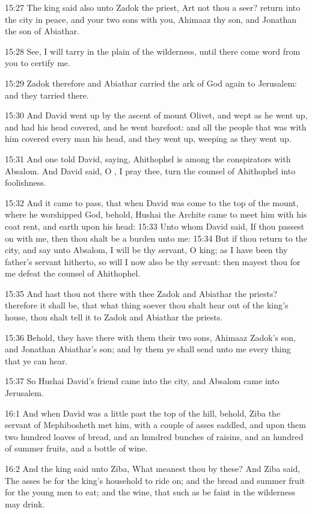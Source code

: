 15:27 The king said also unto Zadok the priest, Art not thou a seer?
return into the city in peace, and your two sons with you, Ahimaaz thy
son, and Jonathan the son of Abiathar.

15:28 See, I will tarry in the plain of the wilderness, until there
come word from you to certify me.

15:29 Zadok therefore and Abiathar carried the ark of God again to
Jerusalem: and they tarried there.

15:30 And David went up by the ascent of mount Olivet, and wept as he
went up, and had his head covered, and he went barefoot: and all the
people that was with him covered every man his head, and they went up,
weeping as they went up.

15:31 And one told David, saying, Ahithophel is among the conspirators
with Absalom. And David said, O \LORD, I pray thee, turn the counsel of
Ahithophel into foolishness.

15:32 And it came to pass, that when David was come to the top of the
mount, where he worshipped God, behold, Hushai the Archite came to
meet him with his coat rent, and earth upon his head: 15:33 Unto whom
David said, If thou passest on with me, then thou shalt be a burden
unto me: 15:34 But if thou return to the city, and say unto Absalom, I
will be thy servant, O king; as I have been thy father's servant
hitherto, so will I now also be thy servant: then mayest thou for me
defeat the counsel of Ahithophel.

15:35 And hast thou not there with thee Zadok and Abiathar the
priests?  therefore it shall be, that what thing soever thou shalt
hear out of the king's house, thou shalt tell it to Zadok and Abiathar
the priests.

15:36 Behold, they have there with them their two sons, Ahimaaz
Zadok's son, and Jonathan Abiathar's son; and by them ye shall send
unto me every thing that ye can hear.

15:37 So Hushai David's friend came into the city, and Absalom came
into Jerusalem.

16:1 And when David was a little past the top of the hill, behold,
Ziba the servant of Mephibosheth met him, with a couple of asses
saddled, and upon them two hundred loaves of bread, and an hundred
bunches of raisins, and an hundred of summer fruits, and a bottle of
wine.

16:2 And the king said unto Ziba, What meanest thou by these? And Ziba
said, The asses be for the king's household to ride on; and the bread
and summer fruit for the young men to eat; and the wine, that such as
be faint in the wilderness may drink.


